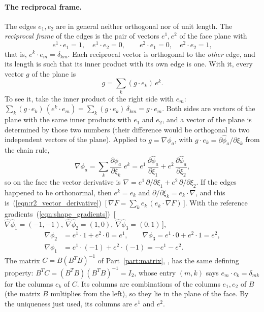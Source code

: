 \paragraph{The reciprocal frame.} The edges $e_1, e_2$ are in general neither orthogonal nor of unit length. The \emph{reciprocal frame} of the edges is the pair of vectors $e^1, e^2$ of the face plane with
\begin{equation*}
e^1\cdot e_1 = 1, \quad e^1\cdot e_2 = 0, \qquad e^2\cdot e_1 = 0, \quad e^2\cdot e_2 = 1 ,
\end{equation*}
that is, $e^k\cdot e_m = \delta_{km}$. Each reciprocal vector is orthogonal to the \emph{other} edge, and its length is such that its inner product with its own edge is one. With it, every vector $g$ of the plane is
\begin{equation*}
g = \sum_k (g\cdot e_k)\, e^k .
\end{equation*}
To see it, take the inner product of the right side with $e_m$: $\sum_k (g\cdot e_k)\,(e^k\cdot e_m) = \sum_k (g\cdot e_k)\,\delta_{km} = g\cdot e_m$. Both sides are vectors of the plane with the same inner products with $e_1$ and $e_2$, and a vector of the plane is determined by those two numbers (their difference would be orthogonal to two independent vectors of the plane). Applied to $g = \nabla\phi_a$, with $g\cdot e_k = \partial\hat\phi_a/\partial\xi_k$ from the chain rule,
\begin{equation*}
\nabla\phi_a = \sum_k \frac{\partial\hat\phi_a}{\partial\xi_k}\; e^k = e^1\,\frac{\partial\hat\phi_a}{\partial\xi_1} + e^2\,\frac{\partial\hat\phi_a}{\partial\xi_2} ,
\end{equation*}
so on the face the vector derivative is $\nabla = e^1\,\partial/\partial\xi_1 + e^2\,\partial/\partial\xi_2$. If the edges happened to be orthonormal, then $e^k = e_k$ and $\partial/\partial\xi_k = e_k\cdot\nabla$, and this is~(\ref{eqn:r2_vector_derivative})~[\,$\nabla F = \sum_k e_k\,(e_k\cdot\nabla F)$\,]. With the reference gradients~(\ref{eqn:shape_gradients})~[\,$\hat\nabla\hat\phi_1 = (-1,-1),\ \hat\nabla\hat\phi_2 = (1,0),\ \hat\nabla\hat\phi_3 = (0,1)$\,],
\begin{align*}
\nabla\phi_2 &= e^1\cdot 1 + e^2\cdot 0 = e^1, \qquad \nabla\phi_3 = e^1\cdot 0 + e^2\cdot 1 = e^2, \\
\nabla\phi_1 &= e^1\cdot(-1) + e^2\cdot(-1) = -e^1 - e^2 .
\end{align*}
The matrix $C = B(B^TB)^{-1}$ of Part~\ref{part:matrix}, , has the same defining property: $B^T C = (B^TB)(B^TB)^{-1} = I_2$, whose entry $(m, k)$ says $e_m\cdot c_k = \delta_{mk}$ for the columns $c_k$ of $C$. Its columns are combinations of the columns $e_1, e_2$ of $B$ (the matrix $B$ multiplies from the left), so they lie in the plane of the face. By the uniqueness just used, its columns are $e^1$ and $e^2$.

